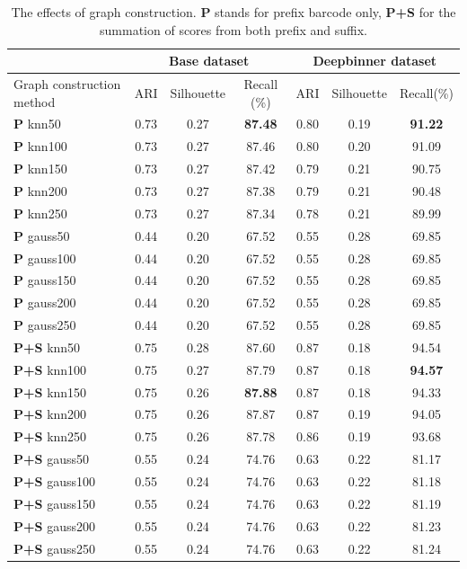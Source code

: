 \begin{table}[!htbp]
\centering
\begin{tabular}{lccc|ccc}
\toprule
 &  \multicolumn{3}{c}{Base dataset} & \multicolumn{3}{c}{Deepbinner dataset}\\
\midrule
Graph construction method  & ARI   & Silhouette    & Recall (\%) & ARI  & Silhouette    & Recall(\%) \\
\textbf{P} knn50 & 0.73 & 0.27 & \textbf{87.48} & 0.80 & 0.19 & \textbf{91.22} \\
\textbf{P} knn100 & 0.73 & 0.27 & 87.46 & 0.80 & 0.20 & 91.09 \\
\textbf{P} knn150 & 0.73 & 0.27 & 87.42 & 0.79 & 0.21 & 90.75 \\
\textbf{P} knn200 & 0.73 & 0.27 & 87.38 & 0.79 & 0.21 & 90.48\\
\textbf{P} knn250 & 0.73 & 0.27 & 87.34 & 0.78 & 0.21 & 89.99\\
\textbf{P} gauss50  & 0.44 & 0.20 & 67.52 & 0.55 & 0.28 & 69.85 \\
\textbf{P} gauss100 & 0.44 & 0.20 & 67.52 & 0.55 & 0.28 & 69.85 \\
\textbf{P} gauss150 & 0.44 & 0.20 & 67.52 & 0.55 & 0.28 & 69.85 \\
\textbf{P} gauss200 & 0.44 & 0.20 & 67.52 & 0.55 & 0.28 & 69.85\\
\textbf{P} gauss250 & 0.44 & 0.20 & 67.52 & 0.55 & 0.28 & 69.85\\
\hline
\textbf{P+S} knn50 & 0.75 & 0.28 & 87.60 & 0.87 & 0.18 & 94.54\\
\textbf{P+S} knn100 & 0.75 & 0.27 & 87.79 & 0.87 & 0.18 & \textbf{94.57}\\
\textbf{P+S} knn150 & 0.75 & 0.26 & \textbf{87.88} & 0.87 & 0.18 & 94.33\\
\textbf{P+S} knn200 & 0.75 & 0.26 & 87.87 & 0.87 & 0.19 & 94.05\\
\textbf{P+S} knn250 & 0.75 & 0.26 & 87.78 & 0.86 & 0.19 & 93.68\\
\textbf{P+S} gauss50  & 0.55 & 0.24 & 74.76 & 0.63 & 0.22 & 81.17\\
\textbf{P+S} gauss100 & 0.55 & 0.24 & 74.76 & 0.63 & 0.22 & 81.18\\
\textbf{P+S} gauss150 & 0.55 & 0.24 & 74.76 & 0.63 & 0.22 & 81.19\\
\textbf{P+S} gauss200 & 0.55 & 0.24 & 74.76 & 0.63 & 0.22 & 81.23\\
\textbf{P+S} gauss250 & 0.55 & 0.24 & 74.76 & 0.63 & 0.22 & 81.24\\
\bottomrule
\end{tabular}
\caption[The effects of graph construction.]{The effects of graph construction. \textbf{P} stands for prefix barcode only, \textbf{P+S} for the summation of scores from both prefix and suffix.}
\label{tab:matrix_preprocess}
\end{table}


